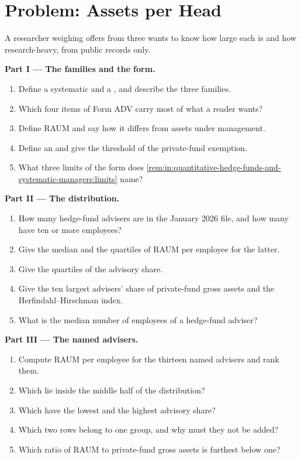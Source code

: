 \section{Problem: Assets per Head}

\begin{problem}\label{pb:in:quantitative-hedge-funds-and-systematic-managers:1}
A researcher weighing offers from three  wants to know how large each is and how research-heavy,
from public records only.

\medskip\noindent\textbf{Part I --- The families and the form.}
\begin{enumerate}
\item Define a systematic and a , and describe the three families.
\item Which four items of Form ADV carry most of what a reader wants?
\item Define RAUM and say how it differs from assets under management.
\item Define an  and give the threshold of the private-fund exemption.
\item What three limits of the form does \cref{rem:in:quantitative-hedge-funds-and-systematic-managers:limits} name?
\end{enumerate}

\medskip\noindent\textbf{Part II --- The distribution.}
\begin{enumerate}[resume]
\item How many hedge-fund advisers are in the January 2026 file, and how many have ten or more employees?
\item Give the median and the quartiles of RAUM per employee for the latter.
\item Give the quartiles of the advisory share.
\item Give the ten largest advisers' share of private-fund gross assets and the Herfindahl--Hirschman index.
\item What is the median number of employees of a hedge-fund adviser?
\end{enumerate}

\medskip\noindent\textbf{Part III --- The named advisers.}
\begin{enumerate}[resume]
\item Compute RAUM per employee for the thirteen named advisers and rank them.
\item Which lie inside the middle half of the distribution?
\item Which have the lowest and the highest advisory share?
\item Which two rows belong to one group, and why must they not be added?
\item Which ratio of RAUM to private-fund gross assets is furthest below one?
\end{enumerate}


\end{problem}
